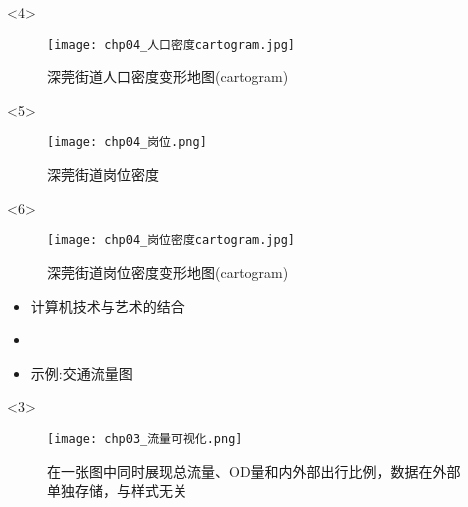 \begin{frame}[t]{\subsecname}
\begin{overlayarea}{\textwidth}{\textheight}
  \begin{onlyenv}<4>
\begin{figure}
  \centering
  \texttt{[image: chp04\_人口密度cartogram.jpg]}
  \caption{深莞街道人口密度变形地图(cartogram)}
\end{figure}
  \end{onlyenv}

  \begin{onlyenv}<5>
\begin{figure}
  \centering
  \texttt{[image: chp04\_岗位.png]}
  \caption{深莞街道岗位密度}
\end{figure}
  \end{onlyenv}

  \begin{onlyenv}<6>
\begin{figure}
  \centering
  \texttt{[image: chp04\_岗位密度cartogram.jpg]}
  \caption{深莞街道岗位密度变形地图(cartogram)}
\end{figure}
  \end{onlyenv}
\end{overlayarea}
\end{frame}

\begin{frame}[t]{\subsecname}
\begin{itemize}
\item<1-> 计算机技术与艺术的结合
\item<2-> 
\item<3-> 示例:交通流量图
\end{itemize}

\begin{overlayarea}{\textwidth}{\textheight}
\vspace{-5pt}
  \begin{onlyenv}<3>
\begin{figure}[ht]
  \centering
  \texttt{[image: chp03\_流量可视化.png]}
  \caption{在一张图中同时展现总流量、OD量和内外部出行比例，数据在外部单独存储，与样式无关}
\end{figure}
  \end{onlyenv}
\end{overlayarea}
\end{frame}

